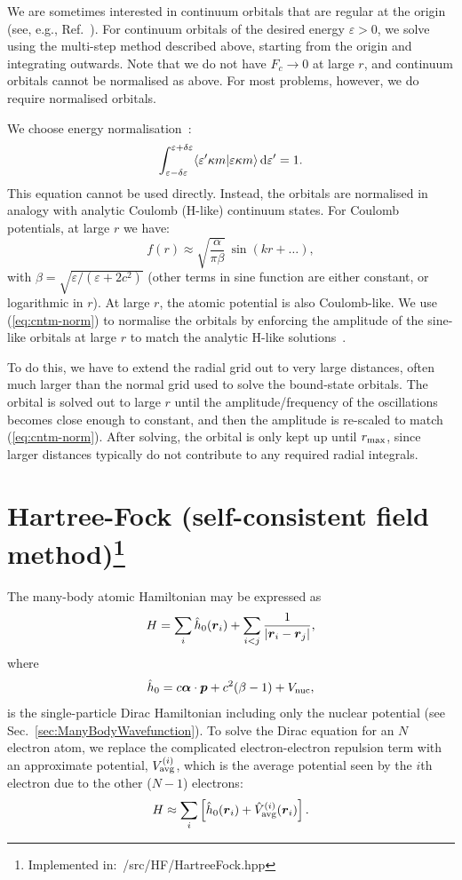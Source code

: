 \documentclass[10pt,twocolumn,a4paper]{article}%
\newcommand{\braket}[1]{\ensuremath{\langle #1\rangle}}	%
\renewcommand{\v}[1]{\ensuremath{\boldsymbol{#1}}}		%
\newcommand{\be}{\begin{equation}}
\newcommand{\ee}{\end{equation}}
\def\d{\ensuremath{{\rm d}}}
\def\en{\ensuremath{\varepsilon}}
\renewcommand{\k}{\ensuremath{\kappa}}
\begin{document}
We are sometimes interested in continuum orbitals that are regular at the origin (see, e.g., Ref.~\cite{BetheBook}).
For continuum orbitals of the desired energy $\en>0$, we solve using the multi-step method described above, starting from the origin and integrating outwards.
Note that we do not have $F_c\to0$ at large $r$, and continuum orbitals cannot be normalised as above.
For most problems, however, we do require normalised orbitals.

We choose energy normalisation~\cite{BetheBook}:
\be
\int_{\en-\delta\en}^{\en+\delta\en}\braket{\en' \k m|\en \k m}\,\d\en' = 1.
\ee
This equation cannot be used directly.
Instead, the orbitals are normalised in analogy with analytic Coulomb (H-like) continuum states.
For Coulomb potentials, at large $r$ we have:
\be\label{eq:cntm-norm}
f(r) \approx \sqrt{\frac{\alpha}{\pi \beta}}\,\sin(kr + \ldots),
\ee
with
$
\beta = \sqrt{{\en}/({\en + 2c^2})}
$
(other terms in sine function are either constant, or logarithmic in $r$).
At large $r$, the atomic potential is also Coulomb-like.
We use (\ref{eq:cntm-norm}) to normalise the orbitals by enforcing the amplitude of the sine-like orbitals at large $r$ to match the analytic H-like solutions~\cite{BetheBook}.

To do this, we have to extend the radial grid out to very large distances, often much larger than the normal grid used to solve the bound-state orbitals.
The orbital is solved out to large $r$ until the amplitude/frequency of the oscillations becomes close enough to constant, and then the amplitude is re-scaled to match (\ref{eq:cntm-norm}).
After solving, the orbital is only kept up until $r_{\rm max}$, since larger distances typically do not contribute to any required radial integrals.



\section[Hartree-Fock (self-consistent field method)]{Hartree-Fock (self-consistent field method)\footnote{Implemented in:~/src/HF/HartreeFock.hpp}}


The many-body atomic Hamiltonian may be expressed as
\be\label{eq:H-manybody}
H = \sum_i \hat h_{\rm 0}(\v{r}_i) + \sum_{i<j}\frac{1}{|\v{r}_i-\v{r}_j|},
\ee
where
\[\hat h_0 = c \v{\alpha}\cdot\v{p} + c^2(\beta-1) +  V_{\rm nuc},\]
is the single-particle Dirac Hamiltonian including only the nuclear potential (see Sec.~\ref{sec:ManyBodyWavefunction}).
To solve the Dirac equation for an $N$ electron atom, we replace the complicated electron-electron repulsion term with an approximate potential, $V_{\rm avg}^{(i)}$,
which is the average potential seen by the $i$th electron due to the other ($N-1$) electrons:
\be
H \approx \sum_i \left[ \hat h_{\rm 0}(\v{r}_i) + \hat V_{\rm avg}^{(i)}(\v{r}_i) \right].
\ee
\end{document}

